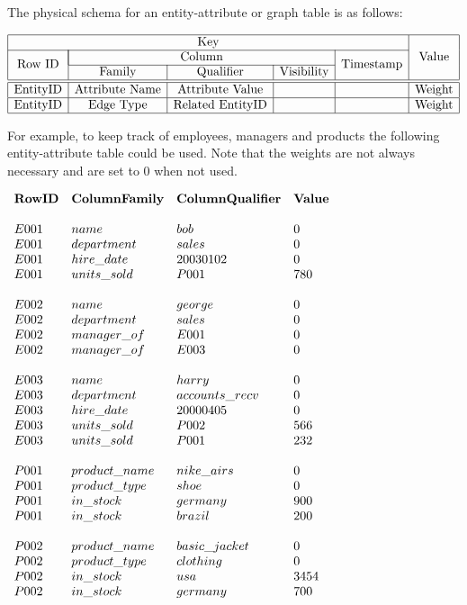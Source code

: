 The physical schema for an entity-attribute or graph table is as follows:

\begin{center}
$\begin{array}{|c|c|c|c|c|c|} \hline
\multicolumn{5}{|c|}{\mbox{Key}} & \multirow{3}{*}{\mbox{Value}}\\ \cline{1-5}
\multirow{2}{*}{\mbox{Row ID}}& \multicolumn{3}{|c|}{\mbox{Column}} & \multirow{2}{*}{\mbox{Timestamp}} & \\ \cline{2-4}
& \mbox{Family} & \mbox{Qualifier} & \mbox{Visibility} & & \\ \hline \hline
\mbox{EntityID} & \mbox{Attribute Name} & \mbox{Attribute Value} & & & \mbox{Weight} \\ \hline
\mbox{EntityID} & \mbox{Edge Type} & \mbox{Related EntityID} & & & \mbox{Weight} \\ \hline
\end{array}$
\end{center}

For example, to keep track of employees, managers and products the following
entity-attribute table could be used. Note that the weights are not always necessary
and are set to 0 when not used.

$\begin{array}{llll}
\bf{RowID} & \bf{Column Family} & \bf{Column Qualifier} & \bf{Value} \\
\\
E001 & name & bob & 0 \\
E001 & department & sales & 0 \\
E001 & hire\_date & 20030102 & 0 \\
E001 & units\_sold & P001 & 780 \\
\\
E002 & name & george & 0 \\
E002 & department & sales & 0 \\
E002 & manager\_of & E001 & 0 \\
E002 & manager\_of & E003 & 0 \\
\\
E003 & name & harry & 0 \\
E003 & department & accounts\_recv & 0 \\
E003 & hire\_date & 20000405 & 0 \\
E003 & units\_sold & P002 & 566 \\
E003 & units\_sold & P001 & 232 \\
\\
P001 & product\_name & nike\_airs & 0 \\
P001 & product\_type & shoe & 0 \\
P001 & in\_stock & germany & 900 \\
P001 & in\_stock & brazil & 200 \\
\\
P002 & product\_name & basic\_jacket & 0 \\
P002 & product\_type & clothing & 0 \\
P002 & in\_stock & usa & 3454 \\
P002 & in\_stock & germany & 700 \\
\end{array}$
\vspace{5mm}

